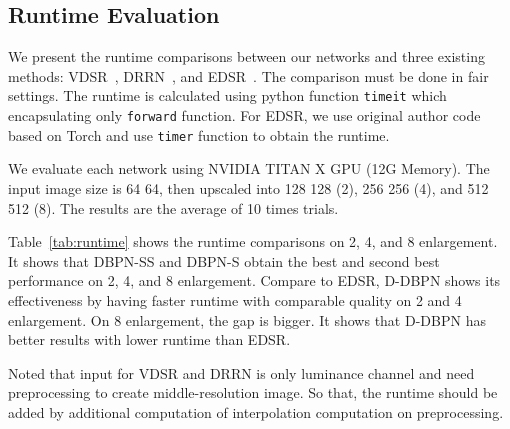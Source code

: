 \documentclass[10pt,journal,compsoc]{IEEEtran}
\begin{document}
\subsection{Runtime Evaluation}
We present the runtime comparisons between our networks and three existing methods: VDSR~\cite{Kim_2016_VDSR}, DRRN~\cite{Tai-DRRN-2017}, and EDSR~\cite{Lim_2017_CVPR_Workshops}. The comparison must be done in fair settings. The runtime is calculated using python function \texttt{timeit} which encapsulating only \texttt{forward} function. For EDSR, we use original author code based on Torch and use \texttt{timer} function to obtain the runtime.

We evaluate each network using NVIDIA TITAN X GPU (12G Memory). The input image size is 64 64, then upscaled into 128 128 (2), 256 256 (4), and 512 512 (8). The results are the average of 10 times trials.

Table~\ref{tab:runtime} shows the runtime comparisons on 2, 4, and 8 enlargement. It shows that DBPN-SS and DBPN-S obtain the best and second best performance on 2, 4, and 8 enlargement. Compare to EDSR, D-DBPN shows its effectiveness by having faster runtime with comparable quality on 2 and 4 enlargement. On 8 enlargement, the gap is bigger. It shows that D-DBPN has better results with lower runtime than EDSR.

Noted that input for VDSR and DRRN is only luminance channel and need preprocessing to create middle-resolution image. So that, the runtime should be added by additional computation of interpolation computation on preprocessing.
\end{document}
